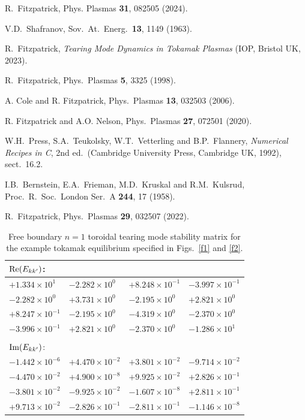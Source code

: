\documentclass[12pt,prb,aps]{revtex4-1}
\begin{document}
\begin{thebibliography}{99}
 R.~Fitzpatrick, Phys. Plasmas {\bf 31}, 082505 (2024).

  V.D.~Shafranov, Sov.\ At.\ Energ.\  {\bf 13}, 1149 (1963).

 R.~Fitzpatrick, {\em Tearing Mode Dynamics in Tokamak Plasmas} (IOP, Bristol UK,  2023).

 R.~Fitzpatrick, Phys.\ Plasmas {\bf 5}, 3325 (1998).

 A. Cole and R. Fitzpatrick, Phys.\ Plasmas {\bf 13}, 032503 (2006).

 R. Fitzpatrick and A.O. Nelson, Phys.\ Plasmas {\bf 27}, 072501 (2020).

 W.H.~Press, S.A.~Teukolsky, W.T.~Vetterling and B.P.~Flannery, {\em Numerical Recipes in C}, 2nd ed.\
(Cambridge University Press, Cambridge UK, 1992), sect.~16.2.

 I.B.~Bernstein, E.A.~Frieman, M.D.~Kruskal and R.M.~Kulsrud, Proc.\ R.\ Soc.\ London Ser.\ A {\bf 244}, 17 (1958).

 R.~Fitzpatrick, Phys.\ Plasmas {\bf 29}, 032507 (2022).

\end{thebibliography}

\iffalse
\newpage
\begin{table}[h]
\centering
\begin{tabular}{llll}
${\rm Re}(E_{kk'})$:&&&\\[0.5ex]\hline
$+1.334\times 10^1$& $-2.282\times 10^0$&  $+8.248\times 10^{-1}$& $-3.997\times 10^{-1} $\\[0.5ex]
$-2.282\times 10^0$& $+3.731\times 10^0 $&$-2.195\times 10^0$ & $+2.821\times 10^0$\\[0.5ex]
$ +8.247\times 10^{-1} $&$-2.195\times 10^0$ &$-4.319\times 10^0$ &$-2.370\times 10^0$ \\[0.5ex]
$-3.996\times 10^{-1}$& $ +2.821\times 10^0$&$ -2.370\times 10^0$ &$-1.286\times 10^1$\\\hline\\[0.5ex]
${\rm Im}(E_{kk'})$:&&&\\[0.5ex]\hline
$-1.442\times 10^{-6}$&  $+4.470\times 10^{-2}$& $ +3.801\times 10^{-2}$& $-9.714\times 10^{-2}$\\[0.5ex]
$-4.470\times 10^{-2}$& $+4.900\times 10^{-8}$&  $+9.925\times 10^{-2}$&  $+2.826\times 10^{-1}$\\[0.5ex]
$-3.801\times 10^{-2}$& $-9.925\times 10^{-2}$& $-1.607\times 10^{-8}$&  $+2.811\times 10^{-1}$\\[0.5ex]
 $+9.713\times 10^{-2}$& $-2.826\times 10^{-1}$& $-2.811\times 10^{-1}$ &$-1.146\times 10^{-8}$
\\\hline
\end{tabular}
\caption{Free boundary $n=1$ toroidal tearing mode stability matrix for the example tokamak equilibrium specified in Figs.~\ref{f1} and \ref{f2}. }\label{t1}
\end{table}
\end{document}
